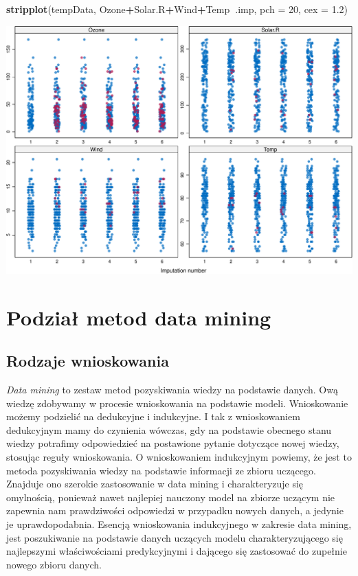 \documentclass[]{book}
\newenvironment{Shaded}{\begin{snugshade}}{\end{snugshade}}
\newcommand{\DataTypeTok}[1]{\textcolor[rgb]{0.13,0.29,0.53}{#1}}
\newcommand{\DecValTok}[1]{\textcolor[rgb]{0.00,0.00,0.81}{#1}}
\newcommand{\FloatTok}[1]{\textcolor[rgb]{0.00,0.00,0.81}{#1}}
\newcommand{\KeywordTok}[1]{\textcolor[rgb]{0.13,0.29,0.53}{\textbf{#1}}}
\newcommand{\NormalTok}[1]{#1}
\newcommand{\OperatorTok}[1]{\textcolor[rgb]{0.81,0.36,0.00}{\textbf{#1}}}
\theoremstyle{plain}
\theoremstyle{definition}
\theoremstyle{definition}
\theoremstyle{definition}
\theoremstyle{definition}
\theoremstyle{remark}
\begin{document}
\begin{Shaded}
\begin{Highlighting}[]
\KeywordTok{stripplot}\NormalTok{(tempData, Ozone}\OperatorTok{+}\NormalTok{Solar.R}\OperatorTok{+}\NormalTok{Wind}\OperatorTok{+}\NormalTok{Temp}\OperatorTok{~}\NormalTok{.imp, }\DataTypeTok{pch =} \DecValTok{20}\NormalTok{, }\DataTypeTok{cex =} \FloatTok{1.2}\NormalTok{)}
\end{Highlighting}
\end{Shaded}

\includegraphics{EksploracjaDanych_files/figure-latex/unnamed-chunk-9-2.pdf}

\hypertarget{podzia-metod-data-mining}{%
\chapter{Podział metod data mining}\label{podzia-metod-data-mining}}

\hypertarget{rodzaje-wnioskowania}{%
\section{Rodzaje wnioskowania}\label{rodzaje-wnioskowania}}

\emph{Data mining} to zestaw metod pozyskiwania wiedzy na podstawie danych. Ową wiedzę zdobywamy w procesie wnioskowania na podstawie modeli. Wnioskowanie możemy podzielić na dedukcyjne i indukcyjne. I tak z wnioskowaniem dedukcyjnym mamy do czynienia wówczas, gdy na podstawie obecnego stanu wiedzy potrafimy odpowiedzieć na postawione pytanie dotyczące nowej wiedzy, stosując reguły wnioskowania. O wnioskowaniem indukcyjnym powiemy, że jest to metoda pozyskiwania wiedzy na podstawie informacji ze zbioru uczącego. Znajduje ono szerokie zastosowanie w data mining i charakteryzuje się omylnością, ponieważ nawet najlepiej nauczony model na zbiorze uczącym nie zapewnia nam prawdziwości odpowiedzi w przypadku nowych danych, a jedynie je uprawdopodabnia. Esencją wnioskowania indukcyjnego w zakresie data mining, jest poszukiwanie na podstawie danych uczących modelu charakteryzującego się najlepszymi właściwościami predykcyjnymi i dającego się zastosować do zupełnie nowego zbioru danych.
\end{document}
